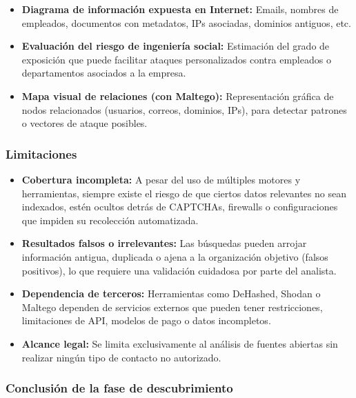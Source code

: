 \documentclass[a4paper, 11pt]{article}
\begin{document}
\begin{itemize}
    \item \textbf{Diagrama de información expuesta en Internet:} Emails, nombres de empleados, documentos con metadatos, IPs asociadas, dominios antiguos, etc.
    \item \textbf{Evaluación del riesgo de ingeniería social:} Estimación del grado de exposición que puede facilitar ataques personalizados contra empleados o departamentos asociados a la empresa.
    \item \textbf{Mapa visual de relaciones (con Maltego):} Representación gráfica de nodos relacionados (usuarios, correos, dominios, IPs), para detectar patrones o vectores de ataque posibles.
\end{itemize}



\subsubsection*{Limitaciones}

\begin{itemize}
\item \textbf{Cobertura incompleta:} A pesar del uso de múltiples motores y herramientas, siempre existe el riesgo de que ciertos datos relevantes no sean indexados, estén ocultos detrás de CAPTCHAs, firewalls o configuraciones que impiden su recolección automatizada.

\item \textbf{Resultados falsos o irrelevantes:} Las búsquedas pueden arrojar información antigua, duplicada o ajena a la organización objetivo (falsos positivos), lo que requiere una validación cuidadosa por parte del analista.    

\item \textbf{Dependencia de terceros:} Herramientas como DeHashed, Shodan o Maltego dependen de servicios externos que pueden tener restricciones, limitaciones de API, modelos de pago o datos incompletos.

\item \textbf{Alcance legal:} Se limita exclusivamente al análisis de fuentes abiertas sin realizar ningún tipo de contacto no autorizado.
\end{itemize}






\subsubsection*{Conclusión de la fase de descubrimiento}
\end{document}

